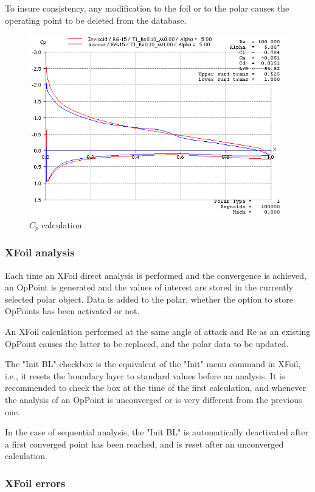 \documentclass[a4paper,twoside,12pt,dvips]{article}
\begin{document}
To insure consistency, any modification to the foil or to the polar
causes the operating point to be deleted from the database.

\begin{figure}[htbp]
  \includegraphics[width=0.8\linewidth]{img-03}\centering 
  \caption{$C_p$ calculation}
  \label{fig:c_p_calculation}
\end{figure}

\subsubsection{XFoil analysis}

Each time an XFoil direct analysis is performed and the convergence is
achieved, an OpPoint is generated and the values of interest are
stored in the currently selected polar object. Data is added to the
polar, whether the option to store OpPoints has been activated or not.

An XFoil calculation performed at the same angle of attack and Re as
an existing OpPoint causes the latter to be replaced, and the polar
data to be updated.

The "Init BL" checkbox is the equivalent of the "Init" menu
command in XFoil, i.e., it resets the boundary layer to standard
values before an analysis. It is recommended to check the box at the
time of the first calculation, and whenever the analysis of an OpPoint
is unconverged or is very different from the previous one.

In the case of sequential analysis, the "Init BL" is automatically
deactivated after a first converged point has been reached, and is
reset after an unconverged calculation.

\subsubsection{XFoil errors}
\end{document}
